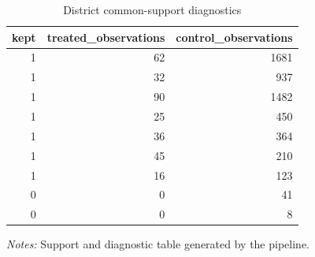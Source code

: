 \begin{table}[!htbp] \centering
\caption{District common-support diagnostics}
\begin{tabular}{rrr}
\toprule
kept & treated\_observations & control\_observations \\
\midrule
1 & 62 & 1681 \\
1 & 32 & 937 \\
1 & 90 & 1482 \\
1 & 25 & 450 \\
1 & 36 & 364 \\
1 & 45 & 210 \\
1 & 16 & 123 \\
0 & 0 & 41 \\
0 & 0 & 8 \\
\bottomrule
\end{tabular}

\begin{minipage}{0.98\textwidth}
\footnotesize \textit{Notes:} Support and diagnostic table generated by the pipeline.
\end{minipage}
\end{table}
